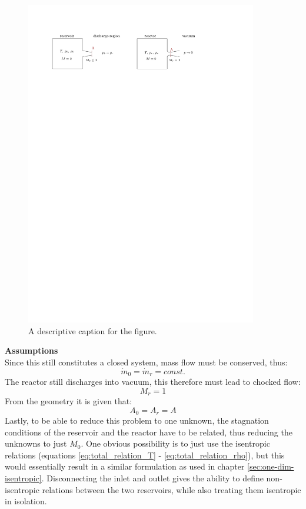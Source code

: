 \begin{figure}[H]
    \centering
    \includegraphics[width=0.9\textwidth]{src/03_analytical-work/fig_disconnected-reservoirs.pdf}
    \caption{A descriptive caption for the figure.}
    \label{fig:disconnected-reservoirs}
\end{figure}

\textbf{Assumptions}\\
Since this still constitutes a closed system, mass flow must be conserved, thus:
$$
	\dot{m}_0 = \dot{m}_r = const.
$$
The reactor still discharges into vacuum, this therefore must lead to chocked flow:
$$
	M_r = 1
$$
From the geometry it is given that:
$$
	A_0 = A_r = A
$$
Lastly, to be able to reduce this problem to one unknown, the stagnation conditions of the reservoir and the reactor have to be related, thus reducing the unknowns to just $M_0$.
One obvious possibility is to just use the isentropic relations (equations \eqref{eq:total_relation_T} - \eqref{eq:total_relation_rho}), but this would essentially result in a similar formulation as used in chapter \ref{sec:one-dim-isentropic}.
Disconnecting the inlet and outlet gives the ability to define non-isentropic relations between the two reservoirs, while also treating them isentropic in isolation.
\newpage

